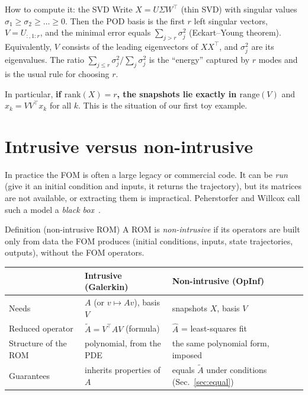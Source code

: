 \documentclass[11pt]{article}
\theoremstyle{remark}\newtheorem{remark}{Remark}
\newcommand{\Ah}{\hat{A}}
\newcommand{\At}{\tilde{A}}
\begin{document}
\begin{keybox}{How to compute it: the SVD}
Write $X=U\Sigma W^\top$ (thin SVD) with singular values $\sigma_1\ge\sigma_2\ge\dots\ge0$. Then the POD basis is the first $r$ left singular vectors, $V=U_{:,1:r}$, and the minimal error equals $\sum_{j>r}\sigma_j^2$ (Eckart--Young theorem). Equivalently, $V$ consists of the leading eigenvectors of $XX^\top$, and $\sigma_j^2$ are its eigenvalues. The ratio $\sum_{j\le r}\sigma_j^2/\sum_j\sigma_j^2$ is the ``energy'' captured by $r$ modes and is the usual rule for choosing $r$.
\end{keybox}

In particular, \textbf{if $\mathrm{rank}(X)=r$, the snapshots lie exactly in $\mathrm{range}(V)$} and $x_k=VV^\top x_k$ for all $k$. This is the situation of our first toy example.

\section{Intrusive versus non-intrusive}\label{sec:intr}
In practice the FOM is often a large legacy or commercial code. It can be \emph{run} (give it an initial condition and inputs, it returns the trajectory), but its matrices are not available, or extracting them is impractical. Peherstorfer and Willcox call such a model a \emph{black box}~\cite[Sec.~1]{PW16}.

\begin{defbox}{Definition (non-intrusive ROM)}
A ROM is \emph{non-intrusive} if its operators are built only from data the FOM produces (initial conditions, inputs, state trajectories, outputs), without the FOM operators.
\end{defbox}

\begin{center}
\begin{tabular}{@{}lll@{}}
\toprule
& Intrusive (Galerkin) & Non-intrusive (OpInf) \\
\midrule
Needs & $A$ (or $v\mapsto Av$), basis $V$ & snapshots $X$, basis $V$ \\
Reduced operator & $\At=V^\top AV$ (formula) & $\Ah$ = least-squares fit \\
Structure of the ROM & polynomial, from the PDE & the same polynomial form, imposed \\
Guarantees & inherits properties of $A$ & equals $\At$ under conditions (Sec.~\ref{sec:equal}) \\
\bottomrule
\end{tabular}
\end{center}
\end{document}
